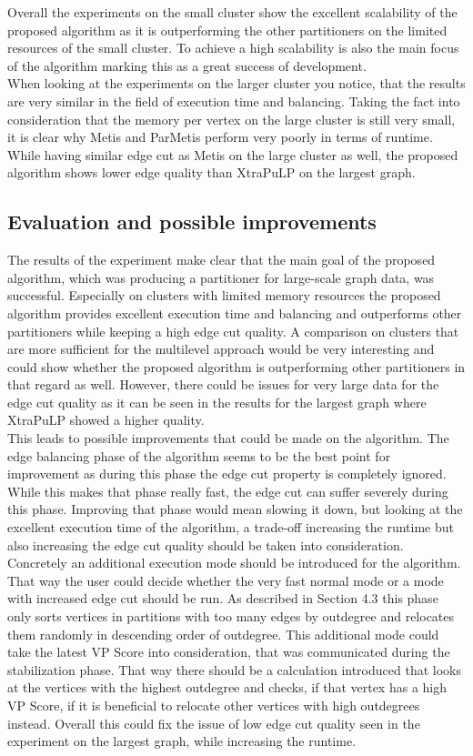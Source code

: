 \documentclass[acmsmall,nonacm,screen,review]{acmart}
\begin{document}
Overall the experiments on the small cluster show the excellent scalability of the proposed algorithm as it is outperforming the other partitioners on the limited resources of the small cluster. To achieve a high scalability is also the main focus of the algorithm marking this as a great success of development.\\
When looking at the experiments on the larger cluster you notice, that the results are very similar in the field of execution time and balancing. Taking the fact into consideration that the memory per vertex on the large cluster is still very small, it is clear why Metis and ParMetis perform very poorly in terms of runtime. While having similar edge cut as Metis on the large cluster as well, the proposed algorithm shows lower edge quality than XtraPuLP on the largest graph. 
\subsection{Evaluation and possible improvements}
The results of the experiment make clear that the main goal of the proposed algorithm, which was producing a partitioner for large-scale graph data, was successful. Especially on clusters with limited memory resources the proposed algorithm provides excellent execution time and balancing and outperforms other partitioners while keeping a high edge cut quality. A comparison on clusters that are more sufficient for the multilevel approach would be very interesting and could show whether the proposed algorithm is outperforming other partitioners in that regard as well. However, there could be issues for very large data for the edge cut quality as it can be seen in the results for the largest graph where XtraPuLP showed a higher quality.\\
This leads to possible improvements that could be made on the algorithm. The edge balancing phase of the algorithm seems to be the best point for improvement as during this phase the edge cut property is completely ignored. While this makes that phase really fast, the edge cut can suffer severely during this phase. Improving that phase would mean slowing it down, but looking at the excellent execution time of the algorithm, a trade-off increasing the runtime but also increasing the edge cut quality should be taken into consideration.\\
Concretely an additional execution mode should be introduced for the algorithm. That way the user could decide whether the very fast normal mode or a mode with increased edge cut should be run. As described in Section 4.3 this phase only sorts vertices in partitions with too many edges by outdegree and relocates them randomly in descending order of outdegree. This additional mode could take the latest VP Score into consideration, that was communicated during the stabilization phase. That way there should be a calculation introduced that looks at the vertices with the highest outdegree and checks, if that vertex has a high VP Score, if it is beneficial to relocate other vertices with high outdegrees instead. Overall this could fix the issue of low edge cut quality seen in the experiment on the largest graph, while increasing the runtime.  
\end{document}
